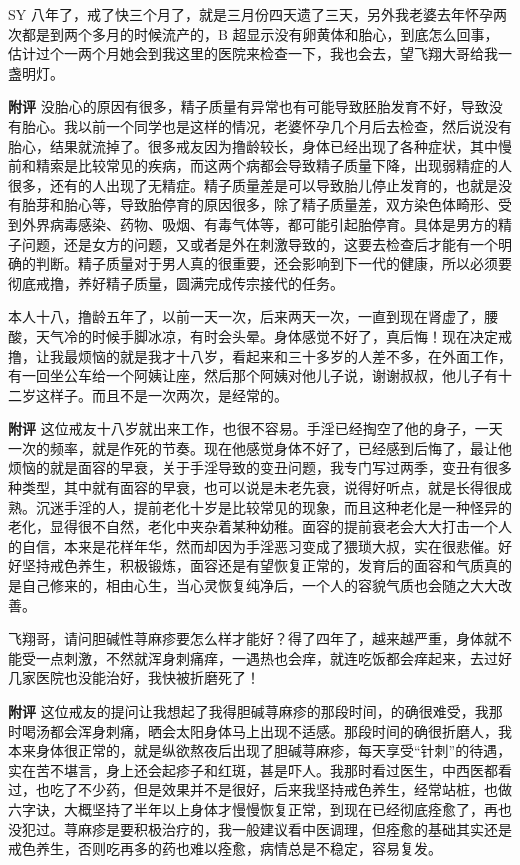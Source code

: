 \begin{case}
    SY 八年了，戒了快三个月了，就是三月份四天遗了三天，另外我老婆去年怀孕两次都是到两个多月的时候流产的，B 超显示没有卵黄体和胎心，到底怎么回事，估计过个一两个月她会到我这里的医院来检查一下，我也会去，望飞翔大哥给我一盏明灯。

    \textbf{附评} 没胎心的原因有很多，精子质量有异常也有可能导致胚胎发育不好，导致没有胎心。我以前一个同学也是这样的情况，老婆怀孕几个月后去检查，然后说没有胎心，结果就流掉了。很多戒友因为撸龄较长，身体已经出现了各种症状，其中慢前和精索是比较常见的疾病，而这两个病都会导致精子质量下降，出现弱精症的人很多，还有的人出现了无精症。精子质量差是可以导致胎儿停止发育的，也就是没有胎芽和胎心等，导致胎停育的原因很多，除了精子质量差，双方染色体畸形、受到外界病毒感染、药物、吸烟、有毒气体等，都可能引起胎停育。具体是男方的精子问题，还是女方的问题，又或者是外在刺激导致的，这要去检查后才能有一个明确的判断。精子质量对于男人真的很重要，还会影响到下一代的健康，所以必须要彻底戒撸，养好精子质量，圆满完成传宗接代的任务。
\end{case}

\begin{case}
    本人十八，撸龄五年了，以前一天一次，后来两天一次，一直到现在肾虚了，腰酸，天气冷的时候手脚冰凉，有时会头晕。身体感觉不好了，真后悔！现在决定戒撸，让我最烦恼的就是我才十八岁，看起来和三十多岁的人差不多，在外面工作，有一回坐公车给一个阿姨让座，然后那个阿姨对他儿子说，谢谢叔叔，他儿子有十二岁这样子。而且不是一次两次，是经常的。

    \textbf{附评} 这位戒友十八岁就出来工作，也很不容易。手淫已经掏空了他的身子，一天一次的频率，就是作死的节奏。现在他感觉身体不好了，已经感到后悔了，最让他烦恼的就是面容的早衰，关于手淫导致的变丑问题，我专门写过两季，变丑有很多种类型，其中就有面容的早衰，也可以说是未老先衰，说得好听点，就是长得很成熟。沉迷手淫的人，提前老化十岁是比较常见的现象，而且这种老化是一种怪异的老化，显得很不自然，老化中夹杂着某种幼稚。面容的提前衰老会大大打击一个人的自信，本来是花样年华，然而却因为手淫恶习变成了猥琐大叔，实在很悲催。好好坚持戒色养生，积极锻炼，面容还是有望恢复正常的，发育后的面容和气质真的是自己修来的，相由心生，当心灵恢复纯净后，一个人的容貌气质也会随之大大改善。
\end{case}

\begin{case}
    飞翔哥，请问胆碱性荨麻疹要怎么样才能好？得了四年了，越来越严重，身体就不能受一点刺激，不然就浑身刺痛痒，一遇热也会痒，就连吃饭都会痒起来，去过好几家医院也没能治好，我快被折磨死了！

    \textbf{附评} 这位戒友的提问让我想起了我得胆碱荨麻疹的那段时间，的确很难受，我那时喝汤都会浑身刺痛，晒会太阳身体马上出现不适感。那段时间的确很折磨人，我本来身体很正常的，就是纵欲熬夜后出现了胆碱荨麻疹，每天享受“针刺”的待遇，实在苦不堪言，身上还会起疹子和红斑，甚是吓人。我那时看过医生，中西医都看过，也吃了不少药，但是效果并不是很好，后来我坚持戒色养生，经常站桩，也做六字诀，大概坚持了半年以上身体才慢慢恢复正常，到现在已经彻底痊愈了，再也没犯过。荨麻疹是要积极治疗的，我一般建议看中医调理，但痊愈的基础其实还是戒色养生，否则吃再多的药也难以痊愈，病情总是不稳定，容易复发。
\end{case}


